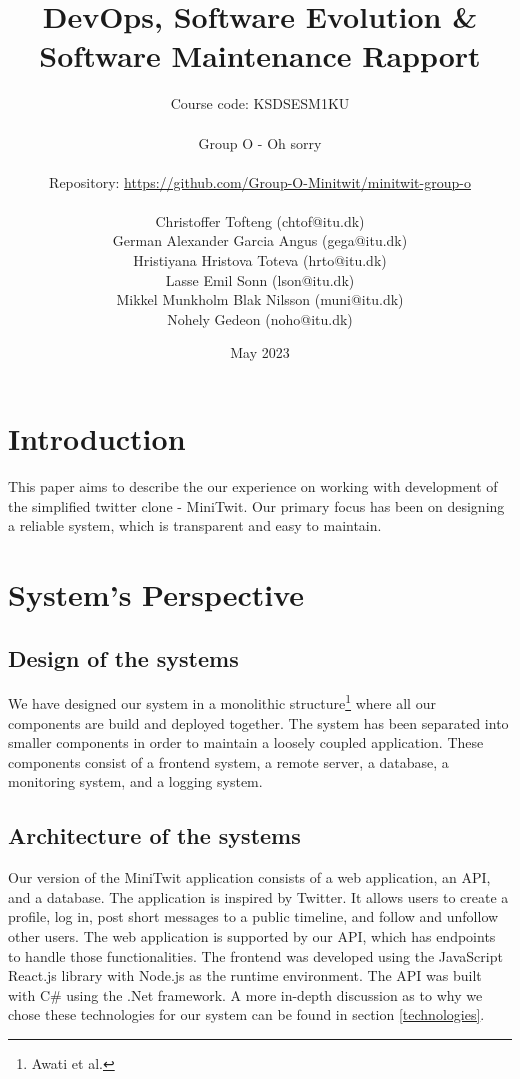\documentclass{article}
\title{DevOps, Software Evolution \& Software Maintenance Rapport}
\author{Course code: KSDSESM1KU\\\\
Group O - Oh sorry\\\\
Repository: \url{https://github.com/Group-O-Minitwit/minitwit-group-o}
\\\\
Christoffer Tofteng (chtof@itu.dk)\\German Alexander Garcia Angus (gega@itu.dk)\\Hristiyana Hristova Toteva (hrto@itu.dk)\\Lasse Emil Sonn (lson@itu.dk)\\Mikkel Munkholm Blak Nilsson (muni@itu.dk)\\Nohely Gedeon (noho@itu.dk)}
\date{May 2023}
\begin{document}
\maketitle
\newpage
\tableofcontents
\newpage

\section{Introduction}
This paper aims to describe the our experience on working with development of the simplified twitter clone - MiniTwit. Our primary focus has been on designing a reliable system, which is transparent and easy to maintain.
\section{System's Perspective}
\subsection{Design of the systems}
We have designed our system in a monolithic structure\footnote{Awati et al.} where all our components are build and deployed together. The system has been separated into smaller components in order to maintain a loosely coupled application. These components consist of a frontend system, a remote server, a database, a monitoring system, and a logging system.
\subsection{Architecture of the systems} 
Our version of the MiniTwit application consists of a web application, an API, and a database. The application is inspired by Twitter. It allows users to create a profile, log in, post short messages to a public timeline, and follow and unfollow other users. The web application is supported by our API, which has endpoints to handle those functionalities. The frontend was developed using the JavaScript React.js library with Node.js as the runtime environment. The API was built with C\# using the .Net framework. A more in-depth discussion as to why we chose these technologies for our system can be found in section \ref{technologies}.
\end{document}

